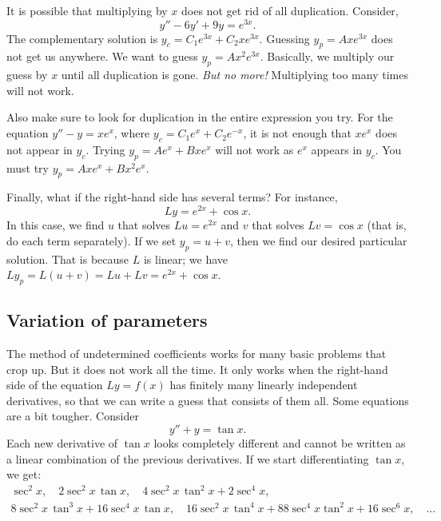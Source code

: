 \medskip

It is possible that
multiplying by $x$ does not get rid of all
duplication.  Consider,
\begin{equation*}
y''-6y'+9y = e^{3x} .
\end{equation*}
The complementary solution is
$y_c = C_1 e^{3x} + C_2 x e^{3x}$.  Guessing $y_p=A xe^{3x}$
does not get us anywhere.
We want to guess $y_p = Ax^2e^{3x}$.
Basically, we multiply our guess by $x$
until all duplication is gone.  \emph{But no more!}  Multiplying too many
times will not work.

Also make sure to look for duplication in the entire expression you try.  For
the equation $y''-y=xe^x$, where $y_c = C_1e^x + C_2e^{-x}$,
it is not enough that $xe^x$ does not appear in $y_c$.
Trying $y_p=Ae^x+Bxe^x$ will not work
as $e^x$ appears in $y_c$.
You must try $y_p=Axe^x+Bx^2e^x$.


\medskip

Finally, what if the right-hand side has several terms?  For instance,
\begin{equation*}
Ly = e^{2x} + \cos x .
\end{equation*}
In this case, we find $u$ that solves $Lu = e^{2x}$ and $v$ that
solves $Lv = \cos x$ (that is, do each term separately).
If we set
$y_p = u+ v$, then we find our desired particular solution.
That is because $L$ is linear; we have
$Ly_p = L(u+v) = Lu + Lv = e^{2x} + \cos x$.

\subsection{Variation of parameters}

The method of undetermined coefficients works for many basic
problems that crop up.  But it does not work all the time.  It only works
when the right-hand side of the equation $Ly = f(x)$ has finitely many
linearly independent derivatives, so that we can write a guess that consists
of them all.  Some equations are a bit tougher.  Consider
\begin{equation*}
y''+y = \tan x .
\end{equation*}
Each new derivative of $\tan x$ looks completely different and
cannot be written as a linear combination of the previous derivatives.
If we start differentiating $\tan x$, we get:
\begin{multline*}
\sec^2 x, \quad
2\sec^2 x \, \tan x, \quad
4 \sec^2 x \, \tan^2 x + 2 \sec^4 x, \\
8 \sec^2 x \, \tan^3 x + 16 \sec^4 x \, \tan x, \quad
16\sec^2 x \, \tan^4 x + 88 \sec^4 x \tan^2 x + 16 \sec^6 x, \quad
\ldots
\end{multline*}

